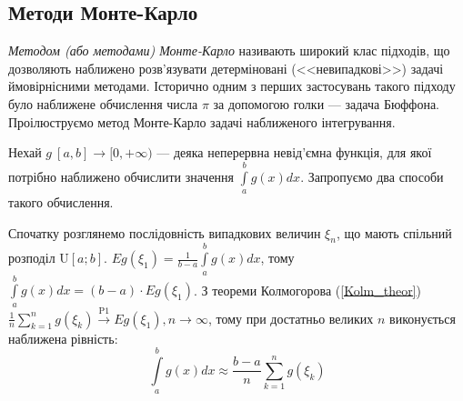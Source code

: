 \subsection{Методи Монте-Карло}
\emph{Методом (або методами) Монте-Карло} називають широкий клас підходів, що дозволяють наближено розв'язувати детерміновані (<<невипадкові>>) задачі ймовірнісними методами. 
Історично одним з перших застосувань такого підходу було наближене обчислення числа $\pi$ за допомогою голки --- задача Бюффона. Проілюструємо метод Монте-Карло задачі наближеного інтегрування.

Нехай $g\:[a,b]\to[0,+\infty)$ --- деяка неперервна невід'ємна функція, для якої потрібно наближено обчислити значення $\int\limits_a^b g(x) dx$. Запропуємо два способи такого обчислення.

Спочатку розглянемо послідовність випадкових величин $\xi_n$, що мають спільний розподіл $\mathrm{U}[a; b]$.
$Eg(\xi_1) = \frac{1}{b-a} \int\limits_a^b g(x) dx$, тому $\int\limits_a^b g(x) dx = (b-a)\cdot E g(\xi_1)$. З теореми Колмогорова (\ref{Kolm_theor})
$\frac{1}{n}\sum\limits_{k=1}^n g(\xi_k) \overset{\mathrm{P1}}{\longrightarrow} Eg(\xi_1), n\to\infty$, тому при достатньо великих $n$ виконується наближена рівність:
$$\int\limits_a^b g(x) dx\approx\frac{b-a}{n}\sum\limits_{k=1}^ng(\xi_k)$$

